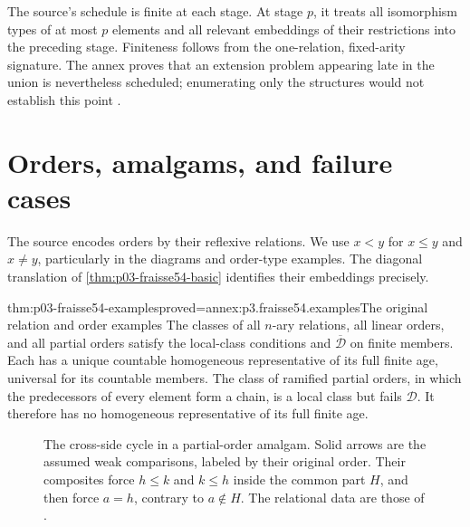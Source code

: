 The source's schedule is finite at each stage. At stage \(p\), it treats
all isomorphism types of at most \(p\) elements and all relevant embeddings
of their restrictions into the preceding stage. Finiteness follows from
the one-relation, fixed-arity signature. The annex proves that an extension
problem appearing late in the union is nevertheless scheduled; enumerating
only the structures would not establish this point
\cite[\S\S8.1--8.5]{Fraisse1954}.

\section{Orders, amalgams, and failure cases}
\label{sec:p03-fraisse54-examples}

The source encodes orders by their reflexive relations. We use
\(x<y\) for \(x\leq y\) and \(x\ne y\), particularly in the diagrams
and order-type examples. The diagonal translation of
\cref{thm:p03-fraisse54-basic} identifies their embeddings precisely.

\begin{hbtheorem}{thm:p03-fraisse54-examples}{proved=annex:p3.fraisse54.examples}{The original relation and order examples}
The classes of all \(n\)-ary relations, all linear orders, and all partial
orders satisfy the local-class conditions and
\(\overline{\mathcal D}\) on finite members. Each has a unique countable
homogeneous representative of its full finite age, universal for its
countable members. The class of ramified partial orders, in which the
predecessors of every element form a chain, is a local class but fails
\(\mathcal D\). It therefore has no homogeneous representative of its
full finite age.
\end{hbtheorem}

\begin{figure}[htbp]
\centering
{}
\caption{The cross-side cycle in a partial-order amalgam. Solid arrows are
the assumed weak comparisons, labeled by their original order.
Their composites force \(h\leq k\) and \(k\leq h\) inside the common
part \(H\), and then force \(a=h\), contrary to \(a\notin H\).
The relational data are those of \cite[Fig.~1, p.~386]{Fraisse1954}.}
\label{fig:p03-fraisse54-order-cycle}
\end{figure}


